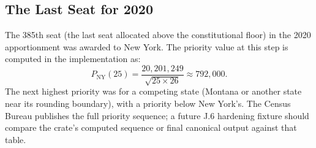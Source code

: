 \subsection{The Last Seat for 2020}

The 385th seat (the last seat allocated above the constitutional floor)
in the 2020 apportionment was awarded to New York.
The priority value at this step is computed in the implementation as:
\[
  P_{\text{NY}}(25) = \frac{20{,}201{,}249}{\sqrt{25 \times 26}}
  \approx 792{,}000.
\]
The next highest priority was for a competing state (Montana or
another state near its rounding boundary), with a priority below
New York's.
The Census Bureau publishes the full priority sequence; a future J.6 hardening
fixture should compare the crate's computed sequence or final canonical output
against that table.
